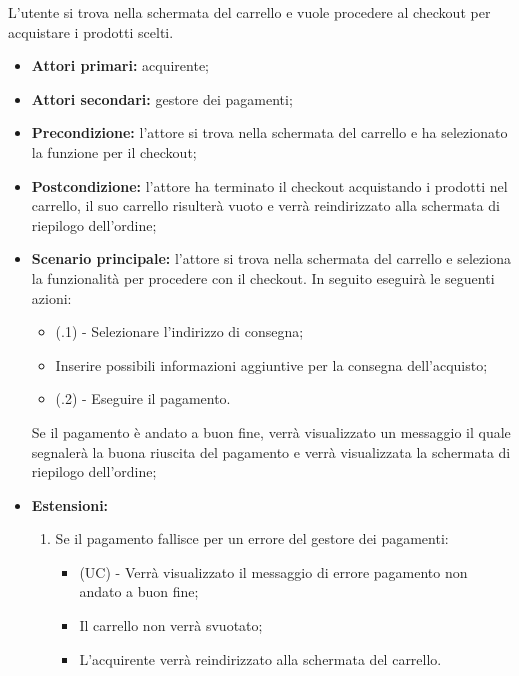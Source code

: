 L'utente si trova nella schermata del carrello e vuole procedere al checkout per acquistare i prodotti scelti.
\begin{itemize}
    \item \textbf{Attori primari:} acquirente;
    \item \textbf{Attori secondari:} gestore dei pagamenti;
    \item \textbf{Precondizione:} l'attore si trova nella schermata del carrello e ha selezionato la funzione per il checkout;
    \item \textbf{Postcondizione:} l'attore ha terminato il checkout acquistando i prodotti nel carrello, il suo carrello risulterà vuoto e verrà reindirizzato alla schermata di riepilogo dell'ordine;
    \item \textbf{Scenario principale:} l'attore si trova nella schermata del carrello e seleziona la funzionalità per procedere con il checkout. In seguito eseguirà le seguenti azioni:
    \begin{itemize}
    	\item (\actualUC.1) - Selezionare l'indirizzo di consegna;
    	\item Inserire possibili informazioni aggiuntive per la consegna dell'acquisto;
        \item (\actualUC.2) - Eseguire il pagamento.
    \end{itemize}
    Se il pagamento è andato a buon fine, verrà visualizzato un messaggio il quale segnalerà la buona riuscita del pagamento e verrà visualizzata la schermata di riepilogo dell'ordine;
    \item \textbf{Estensioni:}
    \begin{enumerate}[label=\lett]
        \item Se il pagamento fallisce per un errore del gestore dei pagamenti:
        \begin{itemize}
            \item (UC) - Verrà visualizzato il messaggio di errore pagamento non andato a buon fine;
            \item Il carrello non verrà svuotato;
            \item L'acquirente verrà reindirizzato alla schermata del carrello.
        \end{itemize}
    \end{enumerate}
\end{itemize}

\resetSubUC

